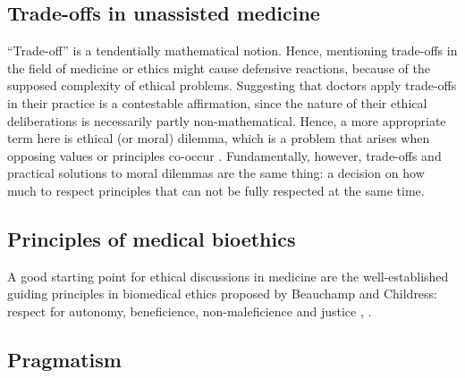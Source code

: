 
\subsection{Trade-offs in unassisted medicine}
``Trade-off'' is a tendentially mathematical notion.
Hence, mentioning trade-offs in the field of medicine or ethics might cause defensive reactions, because of the supposed complexity of ethical problems.
Suggesting that doctors apply trade-offs in their practice is a contestable affirmation, since the nature of their ethical deliberations is necessarily partly non-mathematical.
Hence, a more appropriate term here is ethical (or moral) dilemma, which is a problem that arises when opposing values or principles co-occur \cite[p.~351]{Dijkstra2020}.
Fundamentally, however, trade-offs and practical solutions to moral dilemmas are the same thing: a decision on how much to respect principles that can not be fully respected at the same time.

\subsection{Principles of medical bioethics}
A good starting point for ethical discussions in medicine are the well-established guiding principles in biomedical ethics proposed by Beauchamp and Childress: respect for autonomy, beneficience, non-maleficience and justice \cite[pp.~344-345]{Dijkstra2020}, \cite[p.~2]{Morley2020}.


\subsection{Pragmatism}
